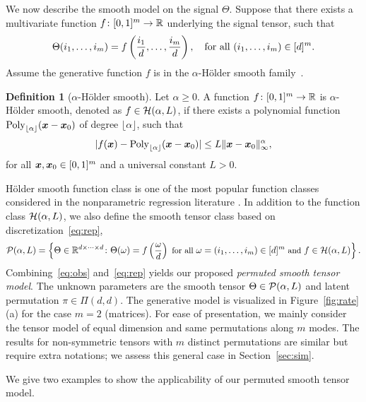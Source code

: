 \documentclass[11pt]{article}
\theoremstyle{definition}
\newtheorem{defn}{Definition}
\begin{document}
We now describe the smooth model on the signal $\Theta$. Suppose that there exists a multivariate function $f\colon [0,1]^m\rightarrow \mathbb{R}$ underlying the signal tensor, such that
\begin{align}\label{eq:rep}
\Theta(i_1,\ldots,i_m) = f\left({i_1\over d},\ldots,{i_m\over d}\right), \quad \text{for all }(i_1,\ldots,i_m)\in[d]^m.
\end{align}
Assume the generative function $f$ is in the $\alpha$-H\"older smooth family~\citep{wasserman2006all,tsybakov2009introduction}. 
\begin{defn}[$\alpha$-H\"older smooth]
Let $\alpha\geq 0$. A function $f\colon [0,1]^m\rightarrow \mathbb{R}$ is $\alpha$-H\"older smooth, denoted as $f\in\mathcal{H}(\alpha,L)$, if there exists a polynomial function $\textup{Poly}_{\lfloor \alpha\rfloor}(\bm x-\bm x_0)$ of degree  $\lfloor \alpha\rfloor$, such that 
\begin{align}\label{eq:defn}
    |f(\bm x) - \textup{Poly}_{\lfloor \alpha\rfloor}(\bm x-\bm x_0)| \leq L\|\bm x-\bm x_0\|_\infty^\alpha,
\end{align}
for all $\bm x,\bm x_0\in [0,1]^m$ and a universal constant $L>0.$ 
\end{defn}
H\"older smooth function class is one of the most popular function classes considered in the nonparametric regression literature \citep{klopp2017oracle,gao2015rate}. 
In addition to the function class $\mathcal{H}(\alpha, L)$, we also define the smooth tensor class based on discretization~\eqref{eq:rep}, 
\[
{\small \mathcal{P}(\alpha,L)= \left\{\Theta\in\mathbb{R}^{d\times \cdots \times d} \colon\Theta(\omega) = f\left({\omega \over d}\right) \text{ for all } \omega=(i_1,\ldots,i_m) \in[d]^m \text{ and } f\in\mathcal{H}(\alpha,L)\right\}.}
\]
Combining~\eqref{eq:obs} and~\eqref{eq:rep} yields our proposed \emph{permuted smooth tensor model}. 
The unknown parameters are the smooth tensor $\Theta \in \mathcal{P}(\alpha, L)$ and latent permutation $\pi \in \Pi(d,d)$. The generative model is visualized in Figure~\ref{fig:rate}(a) for the case $m=2$ (matrices). For ease of presentation, we mainly consider the tensor model of equal dimension and same permutations along $m$ modes. The results for non-symmetric tensors with $m$ distinct permutations are similar but require extra notations; we assess this general case in Section~\ref{sec:sim}. 

We give two examples to show the applicability of our permuted smooth tensor model. 
\end{document}
